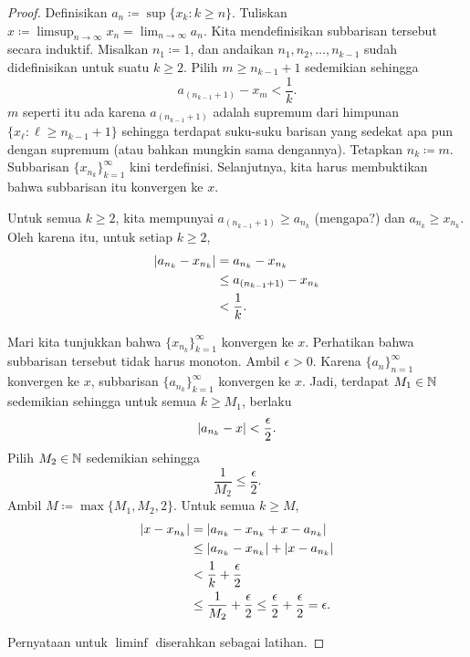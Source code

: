 \begin{proof}
Definisikan $a_n \coloneqq \sup \{ x_k : k \geq n \}$.
Tuliskan
$x \coloneqq \limsup_{n\to\infty} x_n = \lim_{n\to\infty} a_n$.
Kita mendefinisikan subbarisan tersebut secara induktif.
Misalkan $n_1 \coloneqq 1$, dan andaikan $n_1,n_2,\ldots,n_{k-1}$ sudah didefinisikan untuk
suatu $k \geq 2$.  Pilih $m \geq n_{k-1} + 1$
sedemikian sehingga
\begin{equation*}
a_{(n_{k-1}+1)} - x_m < \frac{1}{k} .
\end{equation*}
$m$ seperti itu ada
karena $a_{(n_{k-1}+1)}$ adalah supremum dari
himpunan $\{ x_\ell : \ell \geq n_{k-1} + 1 \}$ sehingga terdapat suku-suku
barisan yang sedekat apa pun dengan supremum (atau bahkan mungkin sama dengannya).
Tetapkan $n_{k} \coloneqq  m$.  Subbarisan $\{ x_{n_k} \}_{k=1}^\infty$ kini terdefinisi.  Selanjutnya, kita
harus membuktikan bahwa subbarisan itu konvergen ke $x$.

Untuk semua $k \geq 2$, kita mempunyai
$a_{(n_{k-1}+1)} \geq a_{n_k}$ (mengapa?) dan $a_{n_{k}} \geq x_{n_k}$.
Oleh karena itu, untuk setiap $k \geq 2$,
\begin{equation*}
\begin{split}
\lvert {a_{n_k} - x_{n_k}} \rvert & = 
a_{n_k} - x_{n_k}
\\
& \leq
a_{(n_{k-1}+1)} - x_{n_k}
\\
& < \frac{1}{k} .
\end{split}
\end{equation*}

Mari kita tunjukkan bahwa $\{ x_{n_k} \}_{k=1}^\infty$ konvergen ke $x$.
Perhatikan bahwa subbarisan tersebut tidak harus monoton.  Ambil $\epsilon > 0$.
Karena $\{ a_n \}_{n=1}^\infty$ konvergen ke $x$, subbarisan
$\{ a_{n_k} \}_{k=1}^\infty$ konvergen ke $x$.
Jadi, terdapat $M_1 \in {\mathbb{N}}$
sedemikian sehingga untuk semua $k \geq M_1$, berlaku
\begin{equation*}
\lvert {a_{n_k} - x} \rvert < \frac{\epsilon}{2} .
\end{equation*}
Pilih $M_2 \in {\mathbb{N}}$ sedemikian sehingga
\begin{equation*}
\frac{1}{M_2} \leq \frac{\epsilon}{2}.
\end{equation*}
Ambil $M \coloneqq \max \{M_1 , M_2 , 2 \}$.  Untuk semua $k \geq M$,
\begin{equation*}
\begin{split}
\lvert {x- x_{n_k}} \rvert & =
\lvert {a_{n_k} - x_{n_k} + x - a_{n_k}} \rvert
\\
& \leq \lvert {a_{n_k} - x_{n_k}} \rvert + \lvert {x - a_{n_k}} \rvert
\\
& < \frac{1}{k} + \frac{\epsilon}{2}
\\
& \leq \frac{1}{M_2} + \frac{\epsilon}{2} \leq \frac{\epsilon}{2} +
\frac{\epsilon}{2} = \epsilon .
\end{split}
\end{equation*}

Pernyataan untuk $\liminf$ diserahkan sebagai latihan.
\end{proof}

